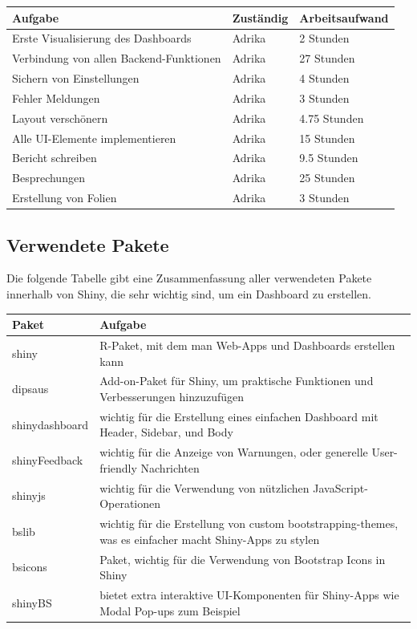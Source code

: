 \documentclass[12pt]{article}
\begin{document}
\begin{table}[h]
	\centering
	\begin{tabular}{l|l|l}
		Aufgabe & Zuständig & Arbeitsaufwand \\ 
		\hline
		Erste Visualisierung des Dashboards             & Adrika    & 2 Stunden        \\
		Verbindung von allen Backend-Funktionen       & Adrika  &  27 Stunden      \\ 
		Sichern von Einstellungen & Adrika & 4 Stunden \\
		Fehler Meldungen              & Adrika    & 3 Stunden        \\ 
		Layout verschönern & Adrika & 4.75 Stunden \\
		Alle UI-Elemente implementieren & Adrika & 15 Stunden \\
		Bericht schreiben & Adrika & 9.5 Stunden \\
		Besprechungen & Adrika & 25 Stunden \\ 
		Erstellung von Folien & Adrika & 3 Stunden 
		
		
	\end{tabular}
\end{table}

\subsection{Verwendete Pakete}
Die folgende Tabelle gibt eine Zusammenfassung aller verwendeten Pakete innerhalb von Shiny, die sehr wichtig sind, um ein Dashboard zu erstellen. 

\begin{table}[h]
	\centering
	\begin{tabular}{|l|p{14cm}|}
		\hline
		Paket & Aufgabe \\ 
		\hline
		shiny & R-Paket, mit dem man Web-Apps und Dashboards erstellen kann \cite{Chang2026}\\
		\hline
		dipsaus & Add-on-Paket für Shiny, um praktische Funktionen und Verbesserungen hinzuzufügen \cite{Wang2026}\\
		\hline
		shinydashboard & wichtig für die Erstellung eines einfachen Dashboard mit Header, Sidebar, und Body \\
		\hline
		shinyFeedback & wichtig für die Anzeige von Warnungen, oder generelle User-friendly Nachrichten \\
		\hline
		shinyjs & wichtig für die Verwendung von nützlichen JavaScript-Operationen \cite{Attali2022}\\
		\hline
		bslib & wichtig für die Erstellung von custom bootstrapping-themes, was es einfacher macht Shiny-Apps zu stylen \cite{Sievert2026}\\
		\hline
		bsicons & Paket, wichtig für die Verwendung von Bootstrap Icons in Shiny \cite{Sievert2023}\\
		\hline
		shinyBS & bietet extra interaktive UI-Komponenten für Shiny-Apps wie Modal Pop-ups zum Beispiel \cite{Bailey2026} \\
		\hline
		
		
	\end{tabular}
\end{table}
\end{document}
